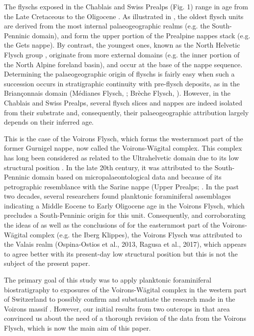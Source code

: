 \documentclass[twoside]{article}
\begin{document}
The flyschs exposed in the Chablais and Swiss Prealps (Fig. 1) range in age from the Late Cretaceous to the Oligocene \citep{Matter1980,Homewood1982,Caron1989}. As illustrated in \cite{Caron1989}, the oldest flysch units are derived from the most internal palaeogeographic realms (e.g. the South-Penninic domain), and form the upper portion of the Prealpine nappes stack (e.g. the Gets nappe). By contrast, the youngest ones, known as the North Helvetic Flysch group \citep{Menkveld-Gfeller2016}, originate from more external domains (e.g. the inner portion of the North Alpine foreland basin), and occur at the base of the nappe sequence. Determining the palaeogeographic origin of flyschs is fairly easy when such a succession occurs in stratigraphic continuity with pre-flysch deposits, as in the Briançonnais domain (Médianes Flysch, \citealp{Caron1980}; Brèche Flysch, \citealp{DallAgnolo2000}). However, in the Chablais and Swiss Prealps, several flysch slices and nappes are indeed isolated from their substrate and, consequently, their palaeogeographic attribution largely depends on their inferred age.\par
This is the case of the Voirons Flysch, which forms the westernmost part of the former Gurnigel nappe, now called the Voirons-Wägital complex. This complex has long been considered as related to the Ultrahelvetic domain due to its low structural position \citep{Lombard1940a,Trumpy1960,Hsu1971}. In the late 20th century, it was attributed to the South-Penninic domain based on micropalaeontological data and because of its petrographic resemblance with the Sarine nappe (Upper Prealps; \citealp{Caron1976,Caron1980,Stuijvenberg1980b,Caron1989,Gasinski1997}. In the past two decades, several researchers \citep{Ujetz1996,Coppo1999,Frebourg2006,Ospina-Ostios2013,Ospina-Ostios2017} found planktonic foraminiferal assemblages indicating a Middle Eocene to Early Oligocene age in the Voirons Flysch, which precludes a South-Penninic origin for this unit. Consequently, and corroborating the ideas of \cite{Schmid2005} as well as the conclusions of \cite{Trumpy2006} for the easternmost part of the Voirons-Wägital complex (e.g. the Iberg Klippes), the Voirons Flysch was attributed to the Valais realm (Ospina-Ostios et al., 2013, Ragusa et al., 2017), which appears to agree better with its present-day low structural position but this is not the subject of the present paper.\par
The primary goal of this study was to apply planktonic foraminiferal biostratigraphy to exposures of the Voirons-Wägital complex in the western part of Switzerland to possibly confirm and substantiate the research made in the Voirons massif \citep{Ujetz1996,Coppo1999,Frebourg2006,Ospina-Ostios2013,Ospina-Ostios2017}. However, our initial results from two outcrops in that area convinced us about the need of a thorough revision of the data from the Voirons Flysch, which is now the main aim of this paper.\par
\end{document}
